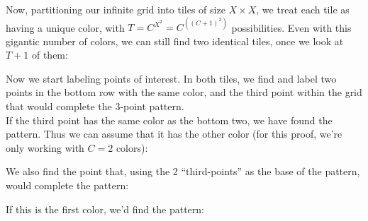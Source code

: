 \documentclass[11pt]{article}
\edef\getxnow(#1,#2){#1}
\edef\getynow(#1,#2){#2}
\newcommand*{\getx}[1]{\expandafter\getxnow#1}
\newcommand*{\gety}[1]{\expandafter\getynow#1}
\newcommand*{\scalePic}{0.4}
\newcommand*{\gridArg}[7]{%
    \foreach \x in {\fpeval{#1},\fpeval{#1+#2},...,\fpeval{#3+0.0001}} %
        \draw [black, thin, #7] (\x,\fpeval{#4}) -- (\x,\fpeval{#6+0.0001});
    \foreach \y in {\fpeval{#4},\fpeval{#4+#5},...,\fpeval{#6+0.0001}}
        \draw [black, thin, #7] (\fpeval{#1},\y) -- (\fpeval{#3+0.0001},\y);
}
\newcommand*{\grid}[6]{\gridArg{#1}{#2}{#3}{#4}{#5}{#6}{}}%
\newcommand*{\mybigbox}[4]{\grid{#1}{#3}{#1+#3}{#2}{#4}{#2+#4}} %
\newcommand*{\mybox}[2]{\mybigbox{#1}{#2}{1}{1}} %
\newcommand*{\myboxes}[1]{\foreach \pt in {#1} {\mybox{\getx{\pt}}{\gety{\pt}}}}
\begin{document}
Now, partitioning our infinite grid into tiles of size $X \times X$, we treat each tile as having a unique color, with $T = C^{X^2} = C^{\left((C+1)^2\right)}$ possibilities. Even with this gigantic number of colors, we can still find two identical tiles, once we look at $T+1$ of them:

\begin{center}
\end{center}

Now we start labeling points of interest. In both tiles, we find and label two points in the bottom row with the same color, and the third point within the grid that would complete the 3-point pattern.\\
If the third point has the same color as the bottom two, we have found the pattern. Thus we can assume that it has the other color (for this proof, we're only working with $C=2$ colors):

\begin{center}
\end{center}

We also find the point that, using the 2 ``third-points'' as the base of the pattern, would complete the pattern:
\begin{center}
\end{center}

If this is the first color, we'd find the pattern:
\begin{center}
\end{center}
\end{document}
